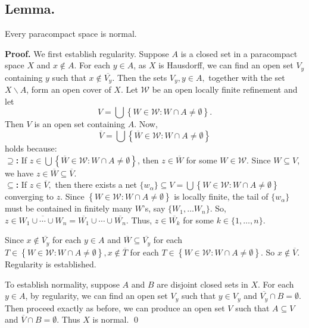 \documentclass{article}
\begin{document}
	  \vskip 40pt


	  \subsection{Lemma.}  Every paracompact space is normal. 

	  \vskip 10pt

	  \textbf{Proof.} We first establish regularity. Suppose $A$ is a closed set in a paracompact space $X$ and $x\notin A$. For each $y\in A$, as $X$ is Hausdorff, we can find an open set $V_y$ containing $y$ such that $x\notin \overline{V_y}$. Then the sets $V_y, y\in A,$ together with the set $X\backslash A$, form an open cover of $X$. Let $\mathcal{W}$ be an open locally finite refinement and let 
	  $$V=\bigcup\left\{ W\in \mathcal{W}: W\cap A\neq \emptyset\right\}.$$
	  \vskip 5pt
	  Then $V$ is an open set containing $A$. Now, 
	  $$\overline{V}=\bigcup\left\{ \overline{W}\in \mathcal{W}: W\cap A\neq \emptyset\right\}$$ holds because:\\
	      \textbf{$\supseteq$:} If $z\in \bigcup\left\{ \overline{W}\in \mathcal{W}: W\cap A\neq \emptyset\right\}$, then $z\in \overline{W}$ for some $W \in \mathcal{W}.$ Since $W\subseteq V$, we have $z\in \overline{W}\subseteq \overline{V}.$\\
	      \textbf{$\subseteq$:} If $z\in \overline{V},$ then there exists a net $\{w_\alpha\}\subseteq V=\bigcup\left\{ W\in \mathcal{W}: W\cap A\neq \emptyset\right\}$ converging to $z$. Since $\left\{W\in \mathcal{W}: W\cap A \neq \emptyset\right\}$ is locally finite, the tail of $\{w_\alpha\}$ must be contained in finitely many $W$'s, say $\{W_1,\dots W_n\}$. So, $z\in \overline{W_1 \cup \cdots \cup W_n}=\overline{W_1}\cup \cdots \cup \overline{W_n}.$ Thus, $z\in \overline{W_k}$ for some $k\in \{1,\dots ,n\}$.
	      \vskip 15pt

	      Since $x\notin \overline{V_y}$ for each $y\in A$ and $\overline{W}\subseteq \overline{V_y}$ for each $T\in \left\{W\in \mathcal{W}: W\cap A\neq \emptyset\right\}, x\notin \overline{T}$ for each $T\in \left\{W\in \mathcal{W}: W\cap A\neq \emptyset\right\}.$ So $x\notin \overline{V}.$ Regularity is established. 


	      \vskip 15pt

	      To establish normality, suppose $A$ and $B$ are disjoint closed sets in $X$. For each $y\in A$, by regularity, 
	      we can find an open set $V_y$ such that $y\in V_y$ and $\overline{V_y}\cap B= \emptyset$. Then proceed exactly as before, we can 
	      produce an open set $V$ such that $A\subseteq V$ and $\overline{V}\cap B=\emptyset.$ Thus $X$ is normal. \qed
\end{document}
